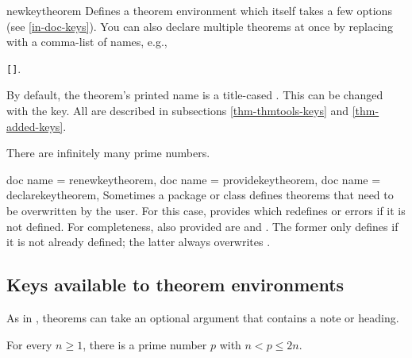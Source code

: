 \documentclass{ltxdoc}
\newcommand{\bracks}[1]{\texttt{[#1]}}
\newcommand{\ttbraces}[1]{\braces{\texttt{#1}}}
\begin{document}
\begin{docCommand}{newkeytheorem}
  {}
Defines a theorem environment  which itself takes a few options (see \autoref{in-doc-keys}).
You can also declare multiple theorems at once by replacing  with a comma-list of names, e.g.,
\begin{center}
\ttbraces{theorem,lemma,proposition}\bracks{}.
\end{center}

By default, the theorem's printed name is a title-cased .
This can be changed with the  key.
All  are described in subsections \ref{thm-thmtools-keys} and \ref{thm-added-keys}.

\begin{codepreamble}
\end{codepreamble}

\begin{keythmscode}[withpreamble]
\begin{theorem}
There are infinitely many prime numbers.
\end{theorem}
\end{keythmscode}

\end{docCommand}

\begin{docCommands}[
  doc parameter=\marg{env name}\oarg{options}
  ]
  {
    {doc name = renewkeytheorem},
    {doc name = providekeytheorem},
    {doc name = declarekeytheorem},
  }
Sometimes a package or class defines theorems that need to be overwritten by the user.
For this case,  provides  which redefines  or errors if it is not defined.
For completeness, also provided are  and .
The former only defines  if it is not already defined; the latter always overwrites .
\end{docCommands}

\subsection{Keys available to theorem environments} \label{in-doc-keys}

As in , theorems can take an optional argument that contains a note or heading.

\begin{keythmscode}
\begin{theorem}
For every $n\geq 1$, there is a prime number $p$ with $n<p\leq 2n$.
\end{theorem}
\end{keythmscode}
\end{document}
